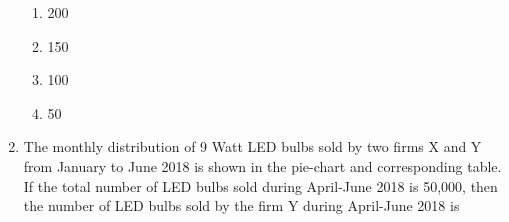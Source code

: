 \documentclass[journal,12pt,onecolumn]{IEEEtran}
\theoremstyle{remark}
\begin{document}
\begin{enumerate}
    \begin{enumerate}
        \item 200
        \item 150
        \item 100
        \item 50
    \end{enumerate}
    \item The monthly distribution of 9 Watt LED bulbs sold by two firms X and Y from January to June 2018 is shown in the pie-chart and corresponding table. If the total number of LED bulbs sold during April-June 2018 is 50,000, then the number of LED bulbs sold by the firm Y during April-June 2018 is {\underline{\hspace{2cm}}}
     \begin{table}[H]
        \centering
          
    \end{table}
\begin{figure}[H]
        \centering
         
    \end{figure}
\end{enumerate}
\end{document}

